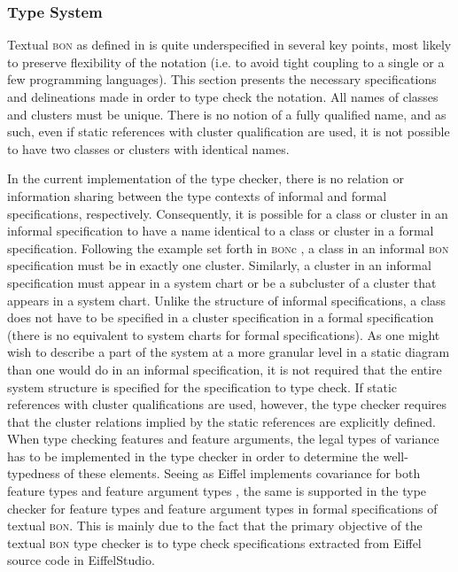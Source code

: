 \subsubsection {Type System}
\label{design-type-system}
Textual \textsc{bon} as defined in \cite{walden1995} is quite underspecified in several key points, most likely to preserve flexibility of the notation (i.e. to avoid tight coupling to a single or a few programming languages). This section presents the necessary specifications and delineations made in order to type check the notation.
\label{design-type-names}
All names of classes and clusters must be unique. There is no notion of a fully qualified name, and as such, even if static references with cluster qualification are used, it is not possible to have two classes or clusters with identical names.

In the current implementation of the type checker, there is no relation or information sharing between the type contexts of informal and formal specifications, respectively. Consequently, it is possible for a class or cluster in an informal specification to have a name identical to a class or cluster in a formal specification.
Following the example set forth in \textsc{bon}c \cite{bonc}, a class in an informal \textsc{bon} specification must be in exactly one cluster. Similarly, a cluster in an informal specification must appear in a system chart or be a subcluster of a cluster that appears in a system chart.
Unlike the structure of informal specifications, a class does not have to be specified in a cluster specification in a formal specification (there is no equivalent to system charts for formal specifications). As one might wish to describe a part of the system at a more granular level in a static diagram than one would do in an informal specification, it is not required that the entire system structure is specified for the specification to type check. If static references with cluster qualifications are used, however, the type checker requires that the cluster relations implied by the static references are explicitly defined.
When type checking features and feature arguments, the legal types of variance has to be implemented in the type checker in order to determine the well-typedness of these elements. Seeing as Eiffel implements covariance for both feature types and feature argument types  \cite[the~Covariance~rule]{meyer2001}, the same is supported in the type checker for feature types and feature argument types in formal specifications of textual \textsc{bon}. This is mainly due to the fact that the primary objective of the textual \textsc{bon} type checker is to type check specifications extracted from Eiffel source code in EiffelStudio.
